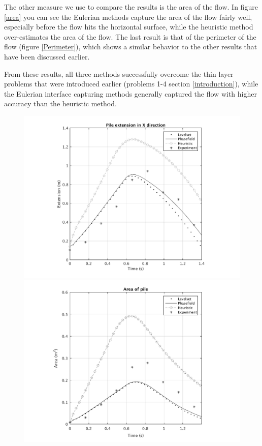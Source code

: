 \documentclass[letterpaper,10pt]{article}
\begin{document}
The other measure we use to compare the results is the area of the flow. 
In figure \ref{area} you can see the Eulerian methods capture the area of the flow fairly well,
especially before the flow hits the horizontal surface, while the heuristic method over-estimates the area of the flow. 
The last result is that of the perimeter of the flow (figure \ref{Perimeter}), which shows a similar behavior 
to the other results that have been discussed earlier. 

From these results, all three methods successfully overcome the thin layer problems that were introduced earlier (problems 1-4 section \ref{introduction}), 
while the Eulerian interface capturing methods generally captured the flow with higher accuracy than the heuristic method.
\begin{figure}[H]
        \begin{minipage}[b]{.5\linewidth}
                \centering
                \includegraphics[scale=0.45]{IMAGES/xextend.png}
                  \label{x_extent}
                \includegraphics[scale=0.45]{IMAGES/area.png}

\end{minipage}
\end{figure}
\end{document}

